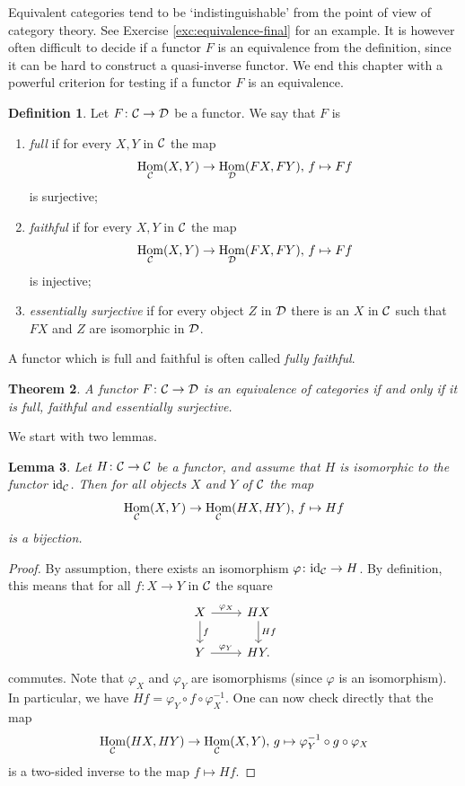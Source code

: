\documentclass[11pt]{amsbook}
\DeclareMathOperator\Hom{Hom}
\def\id{{\rm id}}
\theoremstyle{plain}
\newtheorem{theorem}{Theorem}
\newtheorem{lemma}[theorem]{Lemma}
\theoremstyle{definition}
\newtheorem{definition}[theorem]{Definition}
\begin{document}
Equivalent categories tend to be `indistinguishable' from the point of view of category theory. See Exercise \ref{exc:equivalence-final} for an example. It is however often difficult to decide if a functor $F$ is an equivalence from the definition, since it can be hard to construct a quasi-inverse functor. We end this chapter with a powerful criterion for testing if a functor $F$ is an equivalence.

\begin{definition}
Let $F\colon {\mathcal{C}} \to {\mathcal{D}}$ be a functor. We say that $F$ is
\begin{enumerate}
\item \emph{full} if for every $X,Y$ in ${\mathcal{C}}$ the map
\[
	\Hom_\cC(X,Y) \to \Hom_\cD(FX,FY),\, f \mapsto Ff
\]
 is surjective;
\item \emph{faithful} if for every $X,Y$ in ${\mathcal{C}}$ the map
\[
	\Hom_\cC(X,Y) \to \Hom_\cD(FX,FY),\, f \mapsto Ff
\]
is injective;
\item \emph{essentially surjective} if for every object $Z$ in ${\mathcal{D}}$ there is an $X$ in ${\mathcal{C}}$ such that $FX$ and $Z$ are isomorphic in ${\mathcal{D}}$.
\end{enumerate}
A functor which is full and faithful is often called \emph{fully faithful}.
\end{definition}



\begin{theorem}\label{thm:equivalence-of-categories}
A functor $F\colon {\mathcal{C}} \to {\mathcal{D}}$ is an equivalence of categories if and only if it is full, faithful and essentially surjective.
\end{theorem}

We start with two lemmas. 

\begin{lemma}\label{lemma:functor-iso-to-id}
Let $H\colon {\mathcal{C}} \to {\mathcal{C}}$ be a functor, and assume that $H$ is isomorphic to the functor $\id_\cC$. Then for all objects $X$ and $Y$ of ${\mathcal{C}}$ the map
\[
	\Hom_\cC(X,Y) \to \Hom_\cC(HX, HY),\, f \mapsto Hf
\]
is a bijection.
\end{lemma}

\begin{proof}
By assumption, there exists an isomorphism $\varphi\colon \id_\cC \to H$. By definition, this means that for all $f\colon X\to Y$ in ${\mathcal{C}}$ the square
\[
\begin{tikzcd}
	X \arrow{r}{\varphi_X} \arrow{d}{f} & HX \arrow{d}{Hf} \\
	Y \arrow{r}{\varphi_Y} & HY.
\end{tikzcd}
\]
commutes. Note that $\varphi_X$ and $\varphi_Y$ are isomorphisms (since $\varphi$ is an isomorphism). In particular, we have $Hf = \varphi_Y \circ f \circ \varphi_X^{-1}$. One can now check directly that the map
\[
	\Hom_\cC(HX,HY) \to \Hom_\cC(X,Y),\, g \mapsto \varphi_Y^{-1} \circ g \circ \varphi_X
\]
is a two-sided inverse to the map $f\mapsto Hf$.
\end{proof}
\end{document}
